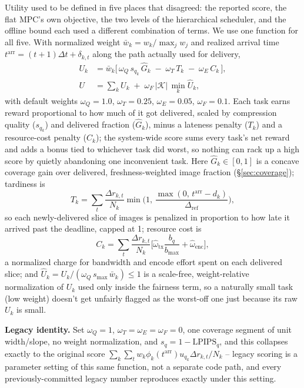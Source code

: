 Utility used to be defined in five places that disagreed: the reported score, the flat MPC's own objective, the two levels of the hierarchical scheduler, and the offline bound each used a different combination of terms. We use one function for all five. With normalized weight $\bar w_k = w_k / \max_j w_j$ and realized arrival time $t^{\mathrm{arr}} = (t{+}1)\Delta t + \delta_{k,t}$ along the path actually used for delivery,
\begin{align}
U_k &= \bar w_k \Big[\, \omega_Q\, s_{q_k}\, \hat G_k
       \;-\; \omega_T\, T_k \;-\; \omega_E\, C_k \,\Big], \\
U &= \sum_k U_k \;+\; \omega_F\, |\mathcal{K}|\, \min_k \hat U_k,
\end{align}
with default weights $\omega_Q = 1.0$, $\omega_T = 0.25$, $\omega_E = 0.05$, $\omega_F = 0.1$. Each task earns reward proportional to how much of it got delivered, scaled by compression quality ($s_{q_k}$) and delivered fraction ($\hat G_k$), minus a lateness penalty ($T_k$) and a resource-cost penalty ($C_k$); the system-wide score sums every task's net reward and adds a bonus tied to whichever task did worst, so nothing can rack up a high score by quietly abandoning one inconvenient task. Here $\hat G_k \in [0,1]$ is a concave coverage gain over delivered, freshness-weighted image fraction (\S\ref{sec:coverage}); tardiness is
\begin{equation}
T_k = \sum_t \frac{\Delta r_{k,t}}{N_k}
  \min\!\Big(1,\, \frac{\max(0,\, t^{\mathrm{arr}} - d_k)}{\Delta_{\mathrm{ref}}}\Big),
\end{equation}
so each newly-delivered slice of images is penalized in proportion to how late it arrived past the deadline, capped at 1; resource cost is
\begin{equation}
C_k = \sum_t \frac{\Delta r_{k,t}}{N_k}
  \Big[\hat\omega_{\mathrm{tx}} \frac{b_q}{b_{\max}} + \hat\omega_{\mathrm{enc}}\Big],
\end{equation}
a normalized charge for bandwidth and encode effort spent on each delivered slice; and $\hat U_k = U_k / (\omega_Q\, s_{\max}\, \bar w_k) \le 1$ is a scale-free, weight-relative normalization of $U_k$ used only inside the fairness term, so a naturally small task (low weight) doesn't get unfairly flagged as the worst-off one just because its raw $U_k$ is small.

\textbf{Legacy identity.} Set $\omega_Q{=}1$, $\omega_T{=}\omega_E{=}\omega_F{=}0$, one coverage segment of unit width/slope, no weight normalization, and $s_q = 1 - \mathrm{LPIPS}_q$, and this collapses exactly to the original score $\sum_k \sum_t w_k \phi_k(t^{\mathrm{arr}}) u_{q_k} \Delta r_{k,t} / N_k$ -- legacy scoring is a parameter setting of this same function, not a separate code path, and every previously-committed legacy number reproduces exactly under this setting.

